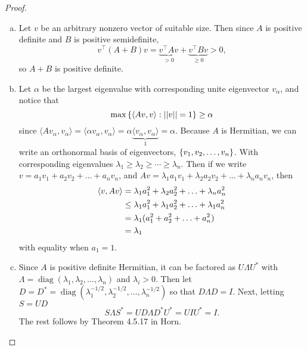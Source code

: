 \documentclass{article}
\begin{document}
\begin{proof} ~
  \begin{enumerate}[(a)]
    \item Let $v$ be an arbitrary nonzero vector of suitable size. Then since
    $A$ is positive definite and $B$ is positive semidefinite, \[
      v^\top(A + B)v
        = \underbrace{v^\top A v}_{> 0} + \underbrace{v^\top B v}_{\geq 0}
        > 0,
    \] so $A + B$ is positive definite.
    \item Let $\alpha$ be the largest eigenvalue with corresponding unite
    eigenvector $v_\alpha$, and notice that \[
      \max\left\{ \langle Av, v \rangle : ||v|| = 1 \right\} \geq \alpha
    \] since $
      \langle A v_\alpha, v_\alpha\rangle
      = \langle \alpha v_\alpha, v_\alpha\rangle
      = \alpha \underbrace{\langle v_\alpha, v_\alpha\rangle}_1
      = \alpha.
    $
    Because $A$ is Hermitian, we can write an orthonormal basis of eigenvectors, $\left\{ v_1, v_2, \dots, v_n \right\}$. With corresponding eigenvalues $\lambda_1 \geq \lambda_2 \geq \cdots \geq \lambda_n$.
    Then if we write $v = a_1v_1 + a_2v_2 + \dots + a_nv_n$, and $Av = \lambda_1a_1v_1 + \lambda_2a_2v_2 + \dots + \lambda_na_nv_n$, then \begin{align*}
      \langle v, Av \rangle
        &= \lambda_1a_1^2 + \lambda_2a_2^2 + \hdots + \lambda_na_n^2 \\
        &\leq \lambda_1a_1^2 + \lambda_1a_2^2 + \hdots + \lambda_1a_n^2 \\
        &= \lambda_1(a_1^2 + a_2^2 + \hdots + a_n^2) \\
        &= \lambda_1
    \end{align*}
    with equality when $a_1 = 1$.
    \item
    Since $A$ is positive definite Hermitian, it can be factored as $U \Lambda U^*$
    with $\Lambda = \operatorname{diag}(\lambda_1, \lambda_2, \dots, \lambda_n)$
    and $\lambda_i > 0$.
    Then let $D = D^* = \operatorname{diag}(\lambda_1^{-1/2}, \lambda_2^{-1/2}, \dots, \lambda_n^{-1/2})$ so that $D\Lambda D = I$. Next, letting $S = UD$ \[
      S\Lambda S^* = UD\Lambda D^*U^* = UIU^* = I.
    \]
    The rest follows by Theorem 4.5.17 in Horn.
  \end{enumerate}
\end{proof}
\end{document}
